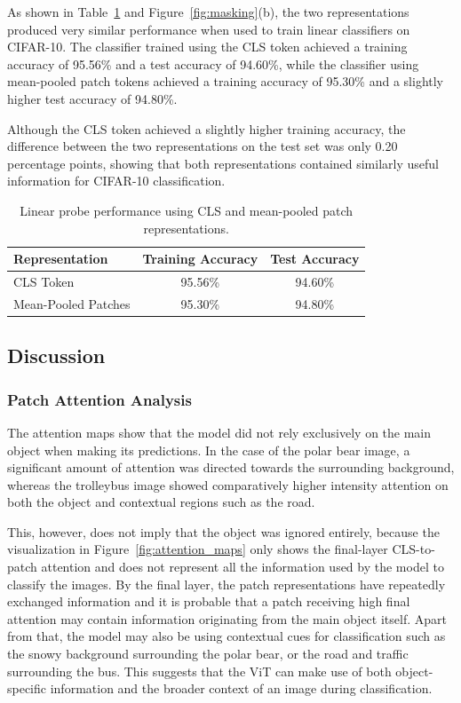 \documentclass{article}
\begin{document}
As shown in Table~\ref{tab:linear_probe} and Figure~\ref{fig:masking}(b), the two representations produced very similar performance when used to train linear classifiers on CIFAR-10. The classifier trained using the CLS token achieved a training accuracy of 95.56\% and a test accuracy of 94.60\%, while the classifier using mean-pooled patch tokens achieved a training accuracy of 95.30\% and a slightly higher test accuracy of 94.80\%.

Although the CLS token achieved a slightly higher training accuracy, the difference between the two representations on the test set was only 0.20 percentage points, showing that both representations contained similarly useful information for CIFAR-10 classification.

\begin{table}[t]
\centering
\caption{Linear probe performance using CLS and mean-pooled patch representations.}
\label{tab:linear_probe}
\begin{tabular}{lcc}
\hline
Representation & Training Accuracy & Test Accuracy \\
\hline
CLS Token & 95.56\% & 94.60\% \\
Mean-Pooled Patches & 95.30\% & 94.80\% \\
\hline
\end{tabular}
\end{table}


\subsection{Discussion}

\subsubsection{Patch Attention Analysis}
The attention maps show that the model did not rely exclusively on the main object when making its predictions. In the case of the polar bear image, a significant amount of attention was directed towards the surrounding background, whereas the trolleybus image showed comparatively higher intensity attention on both the object and contextual regions such as the road. 

This, however, does not imply that the object was ignored entirely, because the visualization in Figure~\ref{fig:attention_maps} only shows the final-layer CLS-to-patch attention and does not represent all the information used by the model to classify the images. By the final layer, the patch representations have repeatedly exchanged information and it is probable that a patch receiving high final attention may contain information originating from the main object itself. Apart from that, the model may also be using contextual cues for classification such as the snowy background surrounding the polar bear, or the road and traffic surrounding the bus. This suggests that the ViT can make use of both object-specific information and the broader context of an image during classification.
\end{document}
